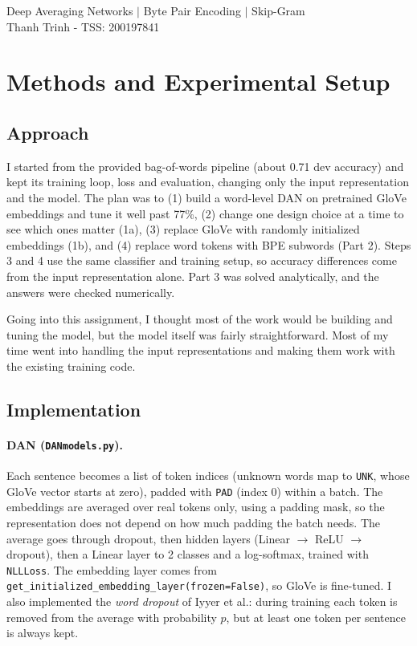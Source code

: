 \documentclass[10pt]{article}
\begin{document}
\begin{center}
{\Large Deep Averaging Networks $|$ Byte Pair Encoding $|$ Skip-Gram}\\[6pt]
Thanh Trinh - TSS: 200197841
\end{center}


\section{Methods and Experimental Setup}

\subsection{Approach}

I started from the provided bag-of-words pipeline (about 0.71 dev accuracy) and kept its training loop, loss and
evaluation, changing only the input representation and the model. The plan was to (1) build a word-level DAN on
pretrained GloVe embeddings and tune it well past 77\%, (2) change one design choice at a time to see which ones
matter (1a), (3) replace GloVe with randomly initialized embeddings (1b), and (4) replace word tokens with BPE
subwords (Part 2). Steps 3 and 4 use the same classifier and training setup, so accuracy differences come from the
input representation alone. Part 3 was solved analytically, and the answers were checked numerically.

Going into this assignment, I thought most of the work would be building and tuning the model, but the model itself
was fairly straightforward. Most of my time went into handling the input representations and making them work with
the existing training code.

\subsection{Implementation}

\paragraph{DAN (\texttt{DANmodels.py}).} Each sentence becomes a list of token indices (unknown words map to
\texttt{UNK}, whose GloVe vector starts at zero), padded with \texttt{PAD} (index 0) within a batch. The embeddings
are averaged over real tokens only, using a padding mask, so the representation does not depend on how much padding
the batch needs. The average goes through dropout, then hidden layers (Linear $\to$ ReLU $\to$ dropout), then a
Linear layer to 2 classes and a log-softmax, trained with \texttt{NLLLoss}. The embedding layer comes from
\texttt{get\_initialized\_embedding\_layer(frozen=False)}, so GloVe is fine-tuned. I also implemented the
\emph{word dropout} of Iyyer et al.: during training each token is removed from the average with probability $p$,
but at least one token per sentence is always kept.
\end{document}
